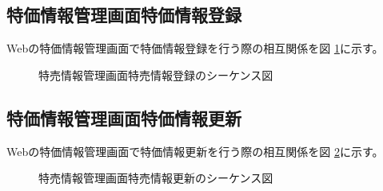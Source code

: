 \documentclass[a4j]{jarticle}
\begin{document}
\subsection{特価情報管理画面特価情報登録}
Webの特価情報管理画面で特価情報登録を行う際の相互関係を図 \ref {tab:oonishi23}に示す。
\begin{figure}[H]
\begin{center}
\caption{特売情報管理画面特売情報登録のシーケンス図}
\label{tab:oonishi23}
\end{center}
\end{figure}
\subsection{特価情報管理画面特価情報更新}
Webの特価情報管理画面で特価情報更新を行う際の相互関係を図 \ref {tab:oonishi24}に示す。
\begin{figure}[H]
\begin{center}
\caption{特売情報管理画面特売情報更新のシーケンス図}
\label{tab:oonishi24}
\end{center}
\end{figure}
\end{document}
